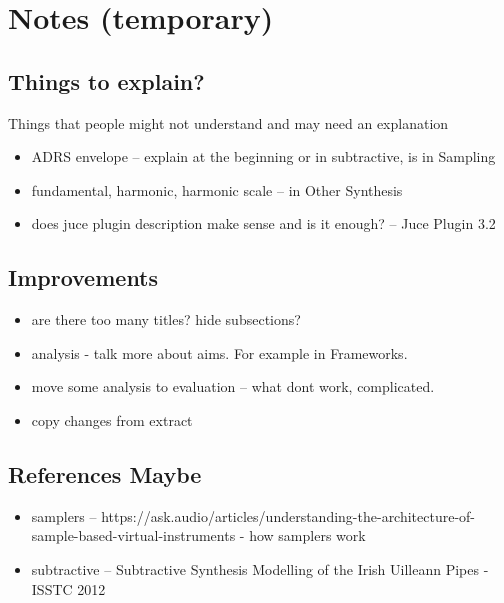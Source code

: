 \documentclass[12pt]{article}
\begin{document}
\section{Notes (temporary)}
	\subsection{Things to explain? }
	Things that people might not understand and may need an explanation
	\begin{itemize}
		\item ADRS envelope -- explain at the beginning or in subtractive, is in Sampling
		\item fundamental, harmonic, harmonic scale -- in Other Synthesis
		\item does juce plugin description make sense and is it enough? -- Juce Plugin 3.2
	\end{itemize}

	\subsection{Improvements}
	\begin{itemize}
		\item are there too many titles? hide subsections?
		\item analysis - talk more about aims. For example in Frameworks.
		\item move some analysis to evaluation -- what dont work, complicated.
		\item copy changes from extract
	\end{itemize}

	\subsection{References Maybe}
	\begin{itemize}
		\item samplers -- https://ask.audio/articles/understanding-the-architecture-of-sample-based-virtual-instruments - how samplers work
		\item subtractive -- Subtractive Synthesis Modelling of the Irish Uilleann Pipes - ISSTC 2012
	\end{itemize}
	



	
\end{document}
